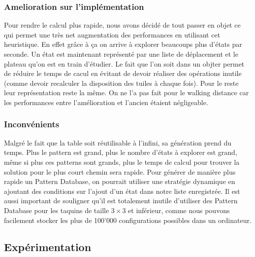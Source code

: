 \documentclass[a4paper, 12pt]{article}
\begin{document}
\subsubsection{Amelioration sur l'implémentation}
Pour rendre le calcul plus rapide, nous avons décidé de tout passer en objet ce qui permet une très net augmentation des performances en utilisant cet heuristique. En effet grâce à ça on arrive à explorer beaucoups plus d'états par seconde. Un état est maintenant représenté par une liste de déplacement et le plateau qu'on est en train d'étudier. Le fait que l'on soit dans un objter permet de réduire le temps de cacul en évitant de devoir réaliser des opérations inutile (comme devoir recalculer la disposition des tuiles à chaque fois). Pour le reste leur représentation reste la même. On ne l'a pas fait pour le walking distance car les performances entre l'amélioration et l'ancien étaient négligeable.
\subsubsection{Inconvénients}
Malgré le fait que la table soit réutilisable à l'infini, sa génération prend du temps. Plus le pattern est grand, plus le nombre d'états à explorer est grand, même si plus ces patterns sont grands, plus le temps de calcul pour trouver la solution pour le plus court chemin sera rapide. Pour générer de manière plus rapide un Pattern Database, on pourrait utiliser une stratégie dynamique en ajoutant des conditions sur l'ajout d'un état dans notre liste enregistrée.
Il est aussi important de souligner qu'il est totalement inutile d'utiliser des Pattern Database pour les taquins de taille $3 \times 3$ et inférieur, comme nous pouvons facilement stocker les plus de 100'000 configurations possibles dans un ordinateur.

\subsection{Expérimentation}
\end{document}
